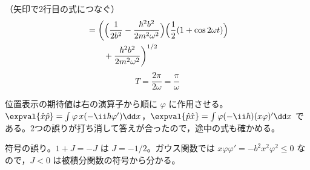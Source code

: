 （矢印で2行目の式につなぐ）
\begin{align*}
&=\biggl(\Bigl(\frac{1}{2b^{2}}-\frac{\hbar^{2}b^{2}}{2m^{2}\omega^{2}}\Bigr)\Bigl(\frac{1}{2}(1+\cos2\omega t)\Bigr)\\
&\qquad+\frac{\hbar^{2}b^{2}}{2m^{2}\omega^{2}}\biggr)^{1/2}
\end{align*}
\[ T=\frac{2\pi}{2\omega}=\frac{\pi}{\omega} \]
\item 位置表示の期待値は右の演算子から順に $\varphi$ に作用させる。$\expval{\hat{x}\hat{p}}=\int\varphi\,x(-\ii\hbar\varphi')\dd x$，$\expval{\hat{p}\hat{x}}=\int\varphi(-\ii\hbar)(x\varphi)'\dd x$ である。2つの誤りが打ち消して答えが合ったので，途中の式も確かめる。
\item {} 符号の誤り。$1+J=-J$ は $J=-1/2$。ガウス関数では $x\varphi\varphi'=-b^{2}x^{2}\varphi^{2}\le0$ なので，$J<0$ は被積分関数の符号から分かる。
